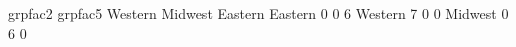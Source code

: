 \begin{Schunk}
\begin{Soutput}
         grpfac2
grpfac5   Western Midwest Eastern
  Eastern       0       0       6
  Western       7       0       0
  Midwest       0       6       0
\end{Soutput}
\end{Schunk}
